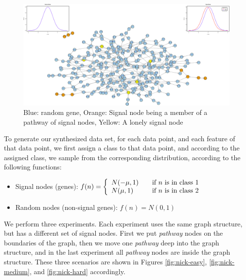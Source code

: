 \begin{figure}[!ht]
  \centering
  \includegraphics[width=\textwidth]{figs/nick/synthesized-1slide}
  \caption{{\color{blue}Blue}: random gene, {\color{orange}Orange}: Signal node being a member of a pathway of signal nodes, {\color{yellow}Yellow}: A lonely signal node}
  \label{fig:syn-1slide}
\end{figure}

To generate our synthesized data set, for each data point, and each feature of that data point, we first assign a class to that data point, and according to the assigned class, we sample from the corresponding distribution, according to the following functions:

\begin{itemize}
\item Signal nodes (genes):
  $ f(n) = \left\{ 
  \begin{array}{l l}
    N(-\mu, 1) & \quad \text{if $n$ is in class $1$}\\
    N(\mu, 1) & \quad \text{if $n$ is in class $2$}
  \end{array} \right.$
\item Random nodes (non-signal genes): $f(n) = N(0, 1)$
\end{itemize}

We perform three experiments. Each experiment uses the same graph structure, but has a different set of signal nodes. First we put \emph{pathway} nodes on the boundaries of the graph, then we move one \emph{pathway} deep into the graph structure, and in the last experiment all \emph{pathway} nodes are inside the graph structure. These three scenarios are shown in Figures \ref{fig:nick-easy}, \ref{fig:nick-medium}, and \ref{fig:nick-hard} accordingly.

